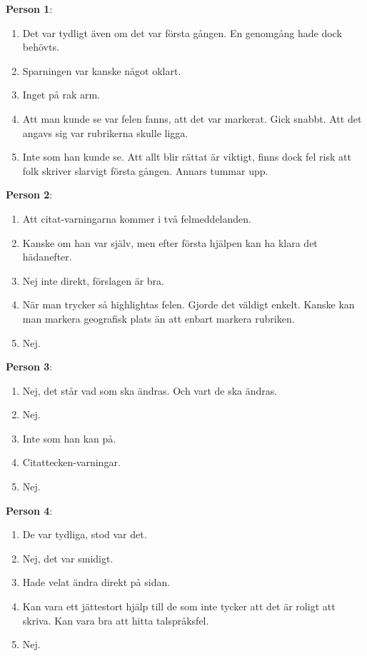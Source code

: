 \textbf{Person 1}:
\begin{enumerate}
\item Det var tydligt även om det var första gången. En genomgång hade dock behövts.
\item Sparningen var kanske något oklart.
\item Inget på rak arm.
\item Att man kunde se var felen fanns, att det var markerat. Gick snabbt. Att det angavs sig var rubrikerna skulle ligga.
\item Inte som han kunde se. Att allt blir rättat är viktigt, finns dock fel risk att folk skriver slarvigt första gången. Annars tummar upp.
\end{enumerate}

\textbf{Person 2}:
\begin{enumerate}
\item Att citat-varningarna kommer i två felmeddelanden.
\item Kanske om han var själv, men efter första hjälpen kan ha klara det hädanefter.
\item Nej inte direkt, förslagen är bra.
\item När man trycker så highlightas felen. Gjorde det väldigt enkelt. Kanske kan man markera geografisk plats än att enbart markera rubriken.
\item Nej.
\end{enumerate}

\textbf{Person 3}:
\begin{enumerate}
\item Nej, det står vad som ska ändras. Och vart de ska ändras.
\item Nej.
\item Inte som han kan på.
\item Citattecken-varningar.
\item Nej.
\end{enumerate}

\textbf{Person 4}:
\begin{enumerate}
\item De var tydliga, stod var det.
\item Nej, det var smidigt.
\item Hade velat ändra direkt på sidan.
\item Kan vara ett jättestort hjälp till de som inte tycker att det är roligt att skriva. Kan vara bra att hitta talspråksfel.
\item Nej.
\end{enumerate}

